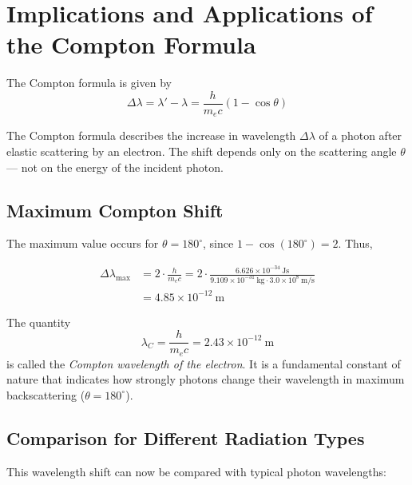 \section{Implications and Applications of the Compton Formula}

The Compton formula is given by
\[
\Delta \lambda = \lambda' - \lambda = \frac{h}{m_e c}(1 - \cos\theta)
\]

\begin{PhysicsBox}
	The Compton formula describes the increase in wavelength \(\Delta \lambda\)
	of a photon after elastic scattering by an electron.
	The shift depends only on the scattering angle \(\theta\) —
	not on the energy of the incident photon.
\end{PhysicsBox}


\subsection*{Maximum Compton Shift}

The maximum value occurs for \( \theta = 180^\circ \), since \( 1 - \cos(180^\circ) = 2 \). Thus,

\begin{align*}
	\Delta \lambda_\text{max} &= 2 \cdot \frac{h}{m_e c}
	= 2 \cdot \frac{6.626 \times 10^{-34}~\text{Js}}{9.109 \times 10^{-31}~\text{kg} \cdot 3.0 \times 10^8~\text{m/s}}\\
	&= 4.85 \times 10^{-12}~\text{m}
\end{align*}


\begin{DidacticBox}
	The quantity
	\[
	\lambda_C = \frac{h}{m_e c} = 2.43 \times 10^{-12}~\text{m}
	\]
	is called the \emph{Compton wavelength of the electron}.
	It is a fundamental constant of nature that indicates
	how strongly photons change their wavelength in maximum backscattering (\(\theta = 180^\circ\)).
\end{DidacticBox}


\subsection*{Comparison for Different Radiation Types}

This wavelength shift can now be compared with typical photon wavelengths:


